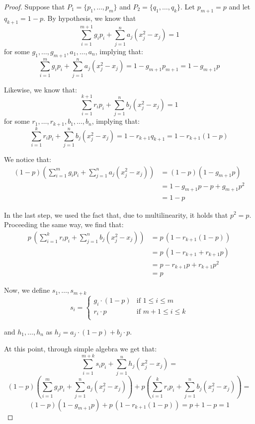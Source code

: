 \begin{proof}
    Suppose that $P_1 = \{p_1, \ldots, p_m\}$ and $P_2 = \{q_1, \ldots, q_k\}$. Let $p_{m+1} = p$ and let $q_{k+1} = 1-p$. By hypothesis, we know that
    \[\sum_{i = 1}^{m+1} g_i p_i + \sum_{j = 1}^n a_j (x_j^2-x_j) = 1\]
    for some $g_1, \ldots, g_{m+1}, a_1, \ldots, a_n$, implying that:
    \[\sum_{i = 1}^{m} g_i p_i + \sum_{j = 1}^n a_j (x_j^2-x_j) = 1 - g_{m+1} p_{m+1} = 1-g_{m+1} p\]
    
    Likewise, we know that:
    \[\sum_{i = 1}^{k+1} r_i p_i + \sum_{j = 1}^n b_j (x_j^2-x_j) = 1\]
    for some $r_1, \ldots, r_{k+1}, b_1, \ldots, b_n$, implying that:
    \[\sum_{i = 1}^{k} r_i p_i + \sum_{j = 1}^n b_j (x_j^2-x_j) = 1-r_{k+1}q_{k+1} = 1-r_{k+1}(1-p)\]

    We notice that:
    \[\begin{split}
        (1-p) \left (\sum_{i = 1}^{m} g_i p_i + \sum_{j = 1}^n a_j (x_j^2-x_j) \right ) &= (1-p)(1-g_{m+1} p) \\
        &= 1-g_{m+1} p - p + g_{m+1} p^2 \\
        &= 1-p 
    \end{split}\]

    In the last step, we used the fact that, due to multilinearity, it holds that $p^2 = p$. Proceeding the same way, we find that:
    \[\begin{split}
        p\, \left (\sum_{i = 1}^{k} r_i p_i + \sum_{j = 1}^n b_j (x_j^2-x_j)  \right ) &= p\,(1-r_{k+1}(1-p)) \\
        &= p \,(1-r_{k+1} + r_{k+1}p) \\
        &= p - r_{k+1} p + r_{k+1} p^2 \\
        &= p 
    \end{split}\]

    Now, we define $s_1, \ldots, s_{m+k}$ 
    \[s_i = \left \{ \begin{array}{ll}
        g_i \cdot (1-p) & \text{if } 1 \leq i \leq m \\
        r_i \cdot p & \text{if } m+1 \leq i \leq k \\
    \end{array} \right .\]
    
    and $h_1, \ldots, h_n$ as $h_j = a_j \cdot (1-p) + b_j \cdot p$.
    
    At this point, through simple algebra we get that:
    \[\sum_{i = 1}^{m+k} s_i p_i + \sum_{j = 1}^n h_j (x_j^2-x_j) =\]
    \[(1-p) \left (\sum_{i = 1}^{m} g_i p_i + \sum_{j = 1}^n a_j (x_j^2-x_j) \right ) + p \left (\sum_{i = 1}^{k} r_i p_i + \sum_{j = 1}^n b_j (x_j^2-x_j)  \right )=\]
    \[(1-p)(1-g_{m+1}p) + p\,(1-r_{k+1}(1-p)) = p + 1- p = 1\]


\end{proof}
